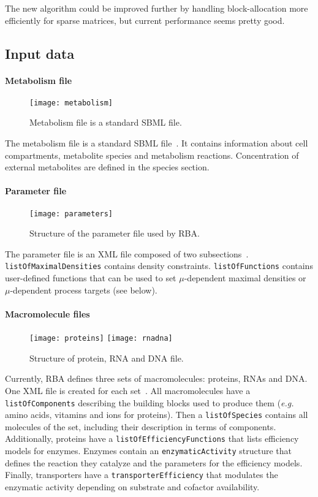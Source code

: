 The new algorithm could be improved further by handling block-allocation more efficiently for sparse matrices, but current performance seems pretty good.

\subsection{Input data}

\paragraph{Metabolism file}
\begin{figure}[ht]
  \centering
  \texttt{[image: metabolism]}
  \caption{Metabolism file is a standard SBML file.}
  \label{fig:metabolism}
\end{figure}
The metabolism file is a standard SBML file~. It contains information about cell compartments, metabolite species and metabolism reactions. Concentration of external metabolites are defined in the species section.

\paragraph{Parameter file}
\begin{figure}[ht]
  \centering
  \texttt{[image: parameters]}
  \caption{Structure of the parameter file used by RBA.}
  \label{fig:parameters}
\end{figure}
The parameter file is an XML file composed of two subsections~. \texttt{listOfMaximalDensities} contains density constraints. \texttt{listOfFunctions} contains user-defined functions that can be used to set $\mu$-dependent maximal densities or $\mu$-dependent process targets (see below).

\paragraph{Macromolecule files}
\begin{figure}[ht]
  \centering
  \texttt{[image: proteins]}
  \texttt{[image: rnadna]}
  \caption{Structure of protein, RNA and DNA file.}
  \label{fig:proteins}
\end{figure}
Currently, RBA defines three sets of macromolecules: proteins, RNAs and DNA. One XML file is created for each set~. All macromolecules have a \texttt{listOfComponents} describing the building blocks used to produce them (\textit{e.g.} amino acids, vitamins and ions for proteins). Then a \texttt{listOfSpecies} contains all molecules of the set, including their description in terms of components. Additionally, proteins have a \texttt{listOfEfficiencyFunctions} that lists efficiency models for enzymes. Enzymes contain an \texttt{enzymaticActivity} structure that defines the reaction they catalyze and the parameters for the efficiency models. Finally, transporters have a \texttt{transporterEfficiency} that modulates the enzymatic activity depending on substrate and cofactor availability.

